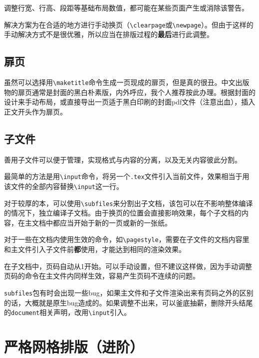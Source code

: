 \documentclass[10pt,openany]{book}
\begin{document}
调整行宽、行高、段距等基础布局数值，都可能在某些页面产生或消除该警告。

解决方案为在合适的地方进行手动换页（\texttt{\textbackslash{}clearpage}或\texttt{\textbackslash{}newpage}）。但由于这样的手动解决方式不是很优雅，所以应当在排版过程的\textbf{最后}进行此调整。

\section{扉页}

虽然可以选择用\texttt{\textbackslash{}maketitle}命令生成一页现成的扉页，但是真的很丑。中文出版物的扉页通常是封面的黑白朴素版，内外呼应，我个人推荐按此办理。根据封面的设计来手动布局，或直接导出一页适于黑白印刷的封面pdf文件（注意出血），插入正文开头作为扉页。



\section{子文件}

善用子文件可以便于管理，实现格式与内容的分离，以及无关内容彼此分割。

最简单的方法是用\texttt{\textbackslash{}input}命令，将另一个\texttt{.tex}文件引入当前文件，效果相当于用该文件的全部内容替换\texttt{\textbackslash{}input}这一行。



对于较厚的本，可以使用\texttt{\textbackslash{}subfiles}来分割出子文档，该包可以在不影响整体编译的情况下，独立编译子文档。由于换页的位置会直接影响效果，每个子文档的内容，在主文档中都应当开始于新的一页或新的一张纸。



对于一些在文档内使用生效的命令，如\texttt{\textbackslash{}pagestyle}，需要在子文件的文档内容里和主文件引入子文件前\textbf{都}使用，才能达到相同的渲染效果。

在子文档中，页码自动从1开始。可以手动设置，但不建议这样做，因为手动调整页码的命令在主文件内同样生效，容易产生页码不连续的问题。

\texttt{subfiles}包有时会出现一些bug，如果主文件和子文件渲染出来有页码之外的区别的话，大概就是原生bug造成的。如果调整不出来，可以釜底抽薪，删除开头结尾的\texttt{document}相关声明，改用\texttt{\textbackslash{}input}引入。

\chapter{严格网格排版（进阶）}
\end{document}
